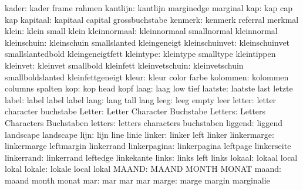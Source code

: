               kader:  kader                frame               rahmen
           kantlijn:  kantlijn             marginedge          marginal
                kap:  kap                  cap                 kap
           kapitaal:  kapitaal             capital             grossbuchstabe
            kenmerk:  kenmerk              referral            merkmal
              klein:  klein                small               klein
       kleinnormaal:  kleinnormaal         smallnormal         kleinnormal
        kleinschuin:  kleinschuin          smallslanted        kleingeneigt
     kleinschuinvet:  kleinschuinvet       smallslantedbold    kleingeneigtfett
          kleintype:  kleintype            smalltype           kleintippen
           kleinvet:  kleinvet             smallbold           kleinfett
     kleinvetschuin:  kleinvetschuin       smallboldslanted    kleinfettgeneigt
              kleur:  kleur                color               farbe
           kolommen:  kolommen             columns             spalten
                kop:  kop                  head                kopf
               laag:  laag                 low                 tief
            laatste:  laatste              last                letzte
              label:  label                label               label
               lang:  lang                 tall                lang
               leeg:  leeg                 empty               leer
             letter:  letter               character           buchstabe
             Letter:  Letter               Character           Buchstabe
            Letters:  Letters              Characters          Buchstaben
            letters:  letters              characters          buchstaben
            liggend:  liggend              landscape           landscape %
               lijn:  lijn                 line                linie
             linker:  linker               left                linker
        linkermarge:  linkermarge          leftmargin          linkerrand
       linkerpagina:  linkerpagina         leftpage            linkerseite
         linkerrand:  linkerrand           leftedge            linkekante
              links:  links                left                links
             lokaal:  lokaal               local               lokal
             lokale:  lokale               local               lokal
              MAAND:  MAAND                MONTH               MONAT
              maand:  maand                month               monat
                mar:  mar                  mar                 mar
              marge:  marge                margin              marginalie
